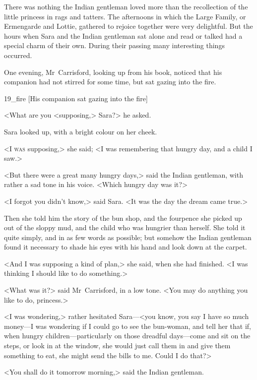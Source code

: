 There was nothing the Indian gentleman loved more than the recollection of the little princess in rags and tatters. The afternoons in which the Large Family, or Ermengarde and Lottie, gathered to rejoice together were very delightful. But the hours when Sara and the Indian gentleman sat alone and read or talked had a special charm of their own. During their passing many interesting things occurred.

One evening, Mr~Carrisford, looking up from his book, noticed that his companion had not stirred for some time, but sat gazing into the fire.

\begin{colorbigpic}
	[\basicscale]
	{19_fire}
	[His companion sat gazing into the fire]
\end{colorbigpic}

<What are you <supposing,> Sara?> he asked.

Sara looked up, with a bright colour on her cheek.

<I \textsc{was} supposing,> she said; <I was remembering that hungry day, and a child I saw.>

<But there were a great many hungry days,> said the Indian gentleman, with rather a sad tone in his voice. <Which hungry day was it?>

<I forgot you didn't know,> said Sara. <It was the day the dream came true.>

Then she told him the story of the bun shop, and the fourpence she picked up out of the sloppy mud, and the child who was hungrier than herself. She told it quite simply, and in as few words as possible; but somehow the Indian gentleman found it necessary to shade his eyes with his hand and look down at the carpet.

<And I was supposing a kind of plan,> she said, when she had finished. <I was thinking I should like to do something.>

<What was it?> said Mr~Carrisford, in a low tone. <You may do anything you like to do, princess.>

<I was wondering,> rather hesitated Sara—<you know, you say I have so much money—I was wondering if I could go to see the bun-woman, and tell her that if, when hungry children—particularly on those dreadful days—come and sit on the steps, or look in at the window, she would just call them in and give them something to eat, she might send the bills to me. Could I do that?>

<You shall do it tomorrow morning,> said the Indian gentleman.

